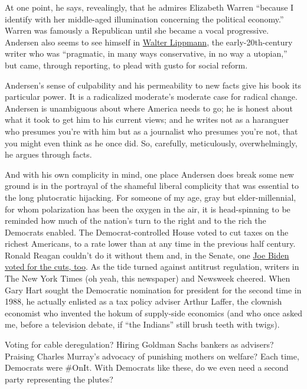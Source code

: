 At one point, he says, revealingly, that he admires Elizabeth Warren
``because I identify with her middle-aged illumination concerning the
political economy.'' Warren was famously a Republican until she became a
vocal progressive. Andersen also seems to see himself in
\href{https://www.britannica.com/biography/Walter-Lippmann}{Walter
Lippmann}, the early-20th-century writer who was ``pragmatic, in many
ways conservative, in no way a utopian,'' but came, through reporting,
to plead with gusto for social reform.

Andersen's sense of culpability and his permeability to new facts give
his book its particular power. It is a radicalized moderate's moderate
case for radical change. Andersen is unambiguous about where America
needs to go; he is honest about what it took to get him to his current
views; and he writes not as a haranguer who presumes you're with him but
as a journalist who presumes you're not, that you might even think as he
once did. So, carefully, meticulously, overwhelmingly, he argues through
facts.

And with his own complicity in mind, one place Andersen does break some
new ground is in the portrayal of the shameful liberal complicity that
was essential to the long plutocratic hijacking. For someone of my age,
gray but elder-millennial, for whom polarization has been the oxygen in
the air, it is head-spinning to be reminded how much of the nation's
turn to the right and to the rich the Democrats enabled. The
Democrat-controlled House voted to cut taxes on the richest Americans,
to a rate lower than at any time in the previous half century. Ronald
Reagan couldn't do it without them and, in the Senate, one
\href{https://www.govtrack.us/congress/votes/97-1981/s251}{Joe Biden
voted for the cuts, too}. As the tide turned against antitrust
regulation, writers in The New York Times (oh yeah, this newspaper) and
Newsweek cheered. When Gary Hart sought the Democratic nomination for
president for the second time in 1988, he actually enlisted as a tax
policy adviser Arthur Laffer, the clownish economist who invented the
hokum of supply-side economics (and who once asked me, before a
television debate, if ``the Indians'' still brush teeth with twigs).

Voting for cable deregulation? Hiring Goldman Sachs bankers as advisers?
Praising Charles Murray's advocacy of punishing mothers on welfare? Each
time, Democrats were \#OnIt. With Democrats like these, do we even need
a second party representing the plutes?

